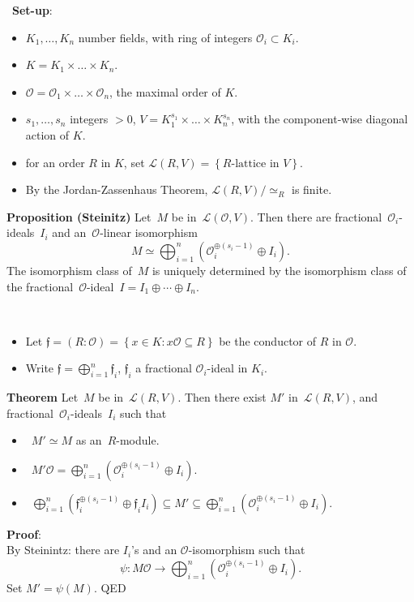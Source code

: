 \documentclass[aspectratio=169,usenames,dvipsnames]{beamer}
\newcommand{\cO}{{\mathcal O}}
\newcommand{\cL}{{\mathcal L}}
\newcommand{\frf}{{\mathfrak f}}
\newcommand{\set}[1]{\left\lbrace#1\right\rbrace }
\begin{document}
\begin{frame}{}\
   {\bf Set-up}:
   \begin{itemize}
      \item $K_1,\ldots,K_n$ number fields, with ring of integers $\cO_i\subset K_i$.
      \item $K=K_1\times \ldots \times K_n$.
      \item $\cO=\cO_1\times \ldots \times \cO_n$, the maximal order of $K$.
      \pause
      \item $s_1,\ldots,s_n$ integers $>0$, $V = K_1^{s_1}\times \ldots\times K_n^{s_n}$, with the component-wise diagonal action of $K$.
      \item for an order $R$ in $K$, set $\cL(R,V) = \set{\text{$R$-lattice in $V$}}$.
      \item By the Jordan-Zassenhaus Theorem, $\cL(R,V)/\simeq_R$ is finite.
   \end{itemize}
   \pause
   \begin{block}{\bf Proposition (Steinitz)}
   Let~$M$ be in~$\cL(\cO,V)$.
   \pause
   Then there are fractional~$\cO_i$-ideals~$I_i$ and an~$\cO$-linear isomorphism
   \[ M\simeq
   \bigoplus_{i=1}^n \left(\cO_i^{\oplus(s_i-1)}\oplus I_i\right).
   \]
   \pause
   The isomorphism class of~$M$ is uniquely determined by 
   the isomorphism class of the fractional~$\cO$-ideal~$I=I_1\oplus \cdots \oplus I_n$.
   \end{block}
\end{frame}

\begin{frame}{}\
   \begin{itemize}
      \item Let $\frf=(R:\cO)=\set{ x \in K : x\cO \subseteq R}$ be the conductor of $R$ in $\cO$.
      \pause
      \item Write $\frf=\bigoplus_{i=1}^n\frf_i$, $\frf_i$ a fractional $\cO_i$-ideal in $K_i$.
   \end{itemize}
   \pause
   \begin{block}{\bf Theorem}
   Let~$M$ be in~$\cL(R,V)$.
   \pause
   Then there exist $M'$ in~$\cL(R,V)$, and fractional~$\cO_i$-ideals~$I_i$ such that
   \pause
   \begin{itemize}
      \item~$M'\simeq M$ as an~$R$-module.
      \pause
      \item~$M'\cO = \bigoplus_{i=1}^n \left(\cO_i^{\oplus(s_i-1)}\oplus I_i\right)$.
      \pause
      \item~$\bigoplus_{i=1}^n \left(\frf_i^{\oplus(s_i-1)}\oplus \frf_iI_i\right) \subseteq M' \subseteq
      \bigoplus_{i=1}^n \left(\cO_i^{\oplus(s_i-1)}\oplus I_i\right)$.
   \end{itemize}
   \end{block}
   \pause
   {\bf Proof}:\\
   By Steinintz: there are $I_i$'s and an $\cO$-isomorphism such that 
   \[ \psi: M\cO \to \bigoplus_{i=1}^n \left(\cO_i^{\oplus(s_i-1)}\oplus I_i\right). \]
   Set $M' = \psi(M)$.\quad
   QED
\end{frame}
\end{document}
